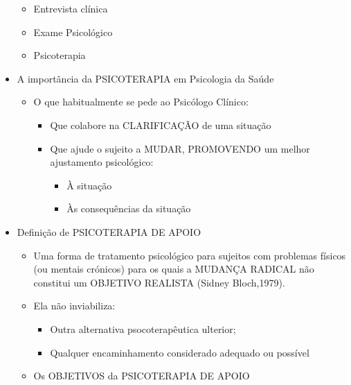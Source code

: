 \documentclass[
]{book}
\providecommand{\tightlist}{%
  \setlength{\itemsep}{0pt}\setlength{\parskip}{0pt}}
\begin{document}
\begin{itemize}
  \begin{itemize}
  \tightlist
  \item
    Entrevista clínica
  \item
    Exame Psicológico
  \item
    Psicoterapia
  \end{itemize}
\item
  A importância da PSICOTERAPIA em Psicologia da Saúde

  \begin{itemize}
  \tightlist
  \item
    O que habitualmente se pede ao Psicólogo Clínico:

    \begin{itemize}
    \tightlist
    \item
      Que colabore na CLARIFICAÇÃO de uma situação
    \item
      Que ajude o sujeito a MUDAR, PROMOVENDO um melhor ajustamento
      psicológico:

      \begin{itemize}
      \tightlist
      \item
        À situação
      \item
        Às consequências da situação
      \end{itemize}
    \end{itemize}
  \end{itemize}
\item
  Definição de PSICOTERAPIA DE APOIO

  \begin{itemize}
  \tightlist
  \item
    Uma forma de tratamento psicológico para sujeitos com problemas
    físicos (ou mentais crónicos) para os quais a MUDANÇA RADICAL não
    constitui um OBJETIVO REALISTA (Sidney Bloch,1979).
  \item
    Ela não inviabiliza:

    \begin{itemize}
    \tightlist
    \item
      Outra alternativa psocoterapêutica ulterior;
    \item
      Qualquer encaminhamento considerado adequado ou possível
    \end{itemize}
  \item
    Os OBJETIVOS da PSICOTERAPIA DE APOIO


\end{itemize}
\end{itemize}
\end{document}
